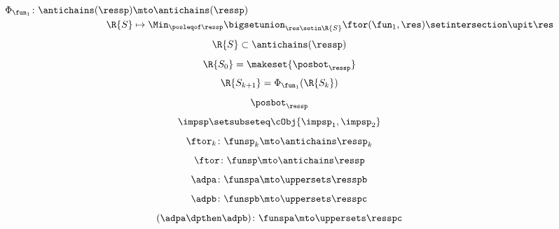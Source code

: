 {\begin{forslides}
\begin{equation}
\begin{aligned}
                \Phi_{\fun_1}\colon \antichains(\ressp) & \mto \antichains(\ressp) \\
                \R{S}                                   & \mapsto \Min_{\posleqof\ressp} \bigsetunion_{\res \setin \R{S}}\ftor(\fun_1,\res)\setintersection \upit \res
            \end{aligned}
        \end{equation}
        \begin{equation}
            \label{eq:genfun_11}
            \R{S}\subset \antichains(\ressp)
        \end{equation}
        \begin{equation}
            \label{eq:genfun_12}
            \R{S_0}=\makeset{ \posbot_\ressp}
        \end{equation}
        \begin{equation}
            \label{eq:genfun_13}
            \R{S_{k+1}}=\Phi_{\fun_1}(\R{S_k})
        \end{equation}
        \begin{equation}
            \label{eq:genfun_14}
            \posbot_{\ressp}
        \end{equation}
        \begin{equation}
            \label{eq:imp_comp}
            \impsp \setsubseteq \cObj{ \impsp_{1}, \impsp_{2}}
        \end{equation}
        \begin{equation}
            \label{eq:dp_mob_4}
            \ftor_k\colon \funsp_k \mto \antichains \ressp_k
        \end{equation}
        \begin{equation}
            \label{eq:dp_mob_5}
            \ftor\colon \funsp \mto \antichains \ressp
        \end{equation}
        \begin{equation}
            \label{eq:dp_mob_6}
            \adpa\colon \funspa \mto \uppersets \resspb
        \end{equation}
        \begin{equation}
            \label{eq:dp_mob_7}
            \adpb\colon \funspb \mto \uppersets \resspc
        \end{equation}
        \begin{equation}
            \label{eq:dp_mob_8}
            (\adpa\dpthen \adpb) \colon \funspa \mto \uppersets \resspc
        \end{equation}
    \end{forslides}
}

